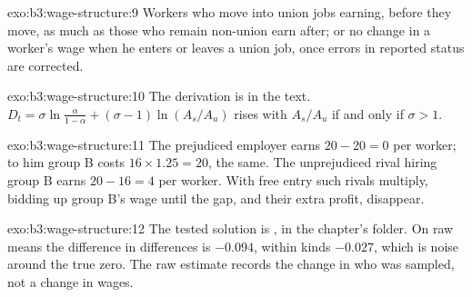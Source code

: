 \begin{solution}{exo:b3:wage-structure:9}
Workers who move into union jobs earning, before they move, as much as those who
remain non-union earn after; or no change in a worker's wage when he enters or leaves
a union job, once errors in reported status are corrected.
\end{solution}

\begin{solution}{exo:b3:wage-structure:10}
The derivation is in the text. $D_t = \sigma\ln\tfrac{\alpha}{1-\alpha} + (\sigma - 1)\ln(A_s/A_u)$ rises with $A_s/A_u$ if and only if $\sigma > 1$.
\end{solution}

\begin{solution}{exo:b3:wage-structure:11}
The prejudiced employer earns $20 - 20 = 0$ per worker; to him group B costs $16 \times 1.25 = 20$, the same.
The unprejudiced rival hiring group B earns $20 - 16 = 4$ per worker. With free entry such
rivals multiply, bidding up group B's wage until the gap, and their extra profit,
disappear.
\end{solution}

\begin{solution}{exo:b3:wage-structure:12}
The tested solution is , in the chapter's  folder.
On raw means the difference in differences is $-0.094$, within kinds $-0.027$, which is noise
around the true zero. %
The raw estimate records the change in who was sampled, not a change in wages.
\end{solution}


